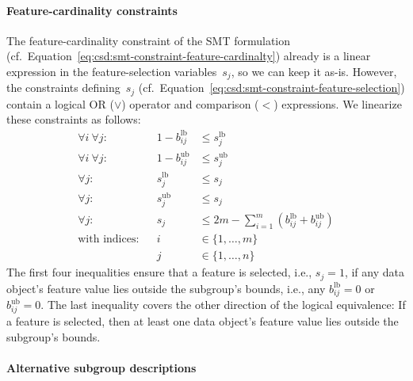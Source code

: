 \documentclass{article}
\theoremstyle{definition}
\begin{document}
\paragraph{Feature-cardinality constraints}

The feature-cardinality constraint of the SMT formulation (cf.~Equation~\ref{eq:csd:smt-constraint-feature-cardinalty}) already is a linear expression in the feature-selection variables~$s_j$, so we can keep it as-is.
However, the constraints defining~$s_j$ (cf.~Equation~\ref{eq:csd:smt-constraint-feature-selection}) contain a logical OR ($\lor$) operator and comparison ($<$) expressions.
We linearize these constraints as follows:
%
\begin{equation}
	\begin{aligned}
		\forall i~\forall j: & & 1 - b^{\text{lb}}_{ij} &\leq s^{\text{lb}}_j \\
		\forall i~\forall j: & & 1 - b^{\text{ub}}_{ij} &\leq s^{\text{ub}}_j \\
		\forall j: & & s^{\text{lb}}_j &\leq s_j \\
		\forall j: & & s^{\text{ub}}_j &\leq s_j \\
		\forall j: & & s_j &\leq 2m - \sum_{i=1}^{m} \left( b^{\text{lb}}_{ij} + b^{\text{ub}}_{ij} \right) \\
		\text{with indices:} & & i &\in \{1, \dots, m\} \\
		& & j &\in \{1, \dots, n\}
	\end{aligned}
	\label{eq:csd:milp-constraint-feature-selection}
\end{equation}
%
The first four inequalities ensure that a feature is selected, i.e., $s_j = 1$, if any data object's feature value lies outside the subgroup's bounds, i.e., any $b^{\text{lb}}_{ij} = 0$ or $b^{\text{ub}}_{ij} = 0$.
The last inequality covers the other direction of the logical equivalence:
If a feature is selected, then at least one data object's feature value lies outside the subgroup's bounds.

\paragraph{Alternative subgroup descriptions}
\end{document}
